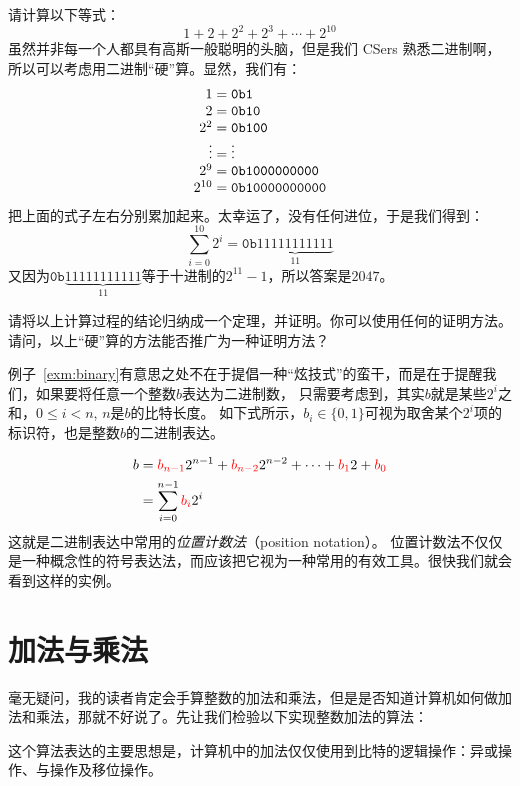 \begin{example}
\label{exm:binary}
请计算以下等式：
	\[1 + 2 + 2^2 + 2^3 + \cdots + 2^{10}\]
虽然并非每一个人都具有高斯一般聪明的头脑，但是我们 CSers 熟悉二进制啊，所以可以考虑用二进制“硬”算。显然，我们有：
\[
\begin{array}{r@{\;}l}
1      &= \mathtt{0b1}\\
2      &= \mathtt{0b10}\\
2^2    &= \mathtt{0b100}\\
\vdots &= \vdots\\
2^9    &= \mathtt{0b1000000000}\\
2^{10} &= \mathtt{0b10000000000}
\end{array}
\]
把上面的式子左右分别累加起来。太幸运了，没有任何进位，于是我们得到：
\[ \sum_{i=0}^{10} 2^i = \mathtt{0b}\underbrace{11111111111}_{11}\]
又因为$\mathtt{0b}\underbrace{11111111111}_{11}$等于十进制的$2^{11}-1$，所以答案是$2047$。
\end{example}

\begin{thinking}
请将以上计算过程的结论归纳成一个定理，并证明。你可以使用任何的证明方法。请问，以上“硬”算的方法能否推广为一种证明方法？
\end{thinking}

例子~\ref{exm:binary}有意思之处不在于提倡一种“炫技式”的蛮干，而是在于提醒我们，如果要将任意一个整数$b$表达为二进制数，
只需要考虑到，其实$b$就是某些$2^i$之和，$0 \le i < n$, $n$是$b$的比特长度。
如下式所示，$b_i \in \{0, 1\}$可视为取舍某个$2^i$项的标识符，也是整数$b$的二进制表达。

\begin{align*}
b &=  {\color{red}b_{n-1}} 2^{n-1} + {\color{red}b_{n-2}} 2^{n-2} + \cdots + {\color{red}b_1} 2 + {\color{red}b_0}\\
    &=  \sum_{i=0}^{n-1} {\color{red}b_i} 2^{i}
\end{align*}
这就是二进制表达中常用的\emph{位置计数法}（position notation）。
位置计数法不仅仅是一种概念性的符号表达法，而应该把它视为一种常用的有效工具。很快我们就会看到这样的实例。

\section{加法与乘法}
\label{sec:int_add_mul}
毫无疑问，我的读者肯定会手算整数的加法和乘法，但是是否知道计算机如何做加法和乘法，那就不好说了。先让我们检验以下实现整数加法的算法：
\begin{center}
	
\end{center}
这个算法表达的主要思想是，计算机中的加法仅仅使用到比特的逻辑操作：异或操作、与操作及移位操作。

